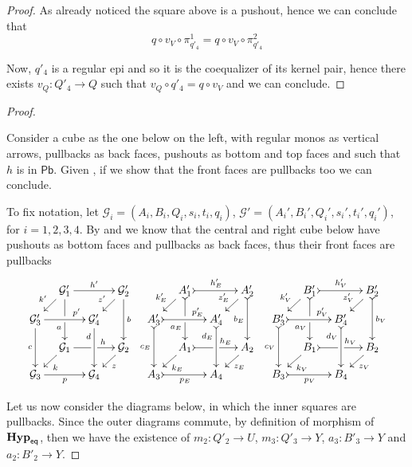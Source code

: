 \documentclass[3p]{elsarticle}
\newcommand{\pbc}{\mathsf{Pb}}
\newcommand{\catname}[1]{\textbf{\textup{#1}}}
\newcommand{\EqHyp}{\catname{Hyp}_{\mathsf{eq}}} %
\theoremstyle{remark}
\theoremstyle{definition}
\begin{document}
\begin{proof}
As already noticed the square above is a pushout, hence we can conclude that
\[
q \circ v_V \circ \pi_{q'_4}^1 = q \circ v_V \circ \pi_{q'_4}^2
\]

Now, $q'_4$ is a regular epi and so it is the coequalizer of its kernel pair, hence there exists $v_Q\colon Q'_4\to Q$ such that $v_Q\circ q'_4=q\circ v_V$ and we can conclude.
\end{proof}

\pbvk*

\begin{proof}\label{proof:pbvk}
	
Consider a cube as the one below on the left, with regular monos as vertical arrows, pullbacks as back faces, pushouts as bottom and top faces and such that $h$ is in $\pbc$.
Given , if we show that the front faces are pullbacks too we can conclude.

To fix notation, let $\mathcal{G}_i = (A_i, B_i, Q_i, s_i, t_i, q_i)$, $\mathcal{G}'=(A_i', B_i', Q_i', s_i', t_i', q_i')$, for $i = 1, 2, 3, 4$. By  and  we know that the central and right cube below have pushouts as bottom faces and pullbacks as back faces,
	thus their front faces are pullbacks
	\[
	\xymatrix@C=10pt@R=10pt{&\mathcal{G}_1'\ar[dd]|\hole_(.65){a}\ar[rr]^{h'} \ar[dl]_{k'} && \mathcal{G}_2' \ar[dd]^{b} \ar[dl]_{z'} & &A_1'\ar@{>->}[dd]|\hole_(.65){a_E}\ar@{>->}[rr]^{h_E'} \ar[dl]_{k_E'} && A_2' \ar@{>->}[dd]_{b_E} \ar[dl]_{z_E'} &&B_1'\ar@{>->}[dd]|\hole_(.65){a_V}\ar@{>->}[rr]^{h_V'} \ar[dl]_{k_V'} && B_2' \ar@{>->}[dd]^{b_V} \ar[dl]_{z_V'} \\ 
		\mathcal{G}_3'  \ar[dd]_{c}\ar[rr]^(.7){p'} & & \mathcal{G}_4' \ar[dd]_(.3){d} &&A_3'  \ar@{>->}[dd]_{c_E}\ar@{>->}[rr]^(.7){p_E'} & & A_4' \ar@{>->}[dd]_(.3){d_E}
		&&B_3'  \ar@{>->}[dd]_{c_V}\ar@{>->}[rr]^(.7){p_V'} & & B_4' \ar@{>->}[dd]_(.3){d_V}\\
		&\mathcal{G}_1\ar[rr]|\hole^(.65){h} \ar[dl]^{k} && \mathcal{G}_2 \ar[dl]^{z} & &A_1\ar@{>->}[rr]|\hole^(.65){h_E} \ar[dl]^{k_E} && A_2 \ar[dl]^{z_E} &&B_1\ar@{>->}[rr]|\hole^(.65){h_V} \ar[dl]^{k_V} && B_2 \ar[dl]^{z_V} \\
		\mathcal{G}_3 \ar[rr]_{p} & & \mathcal{G}_4 && A_3 \ar@{>->}[rr]_{p_E} & & A_4&&B_3 \ar@{>->}[rr]_{p_V} & & B_4 }
	\]


Let us now consider the diagrams below, in which the inner squares are pullbacks.	Since the outer diagrams commute, by definition of morphism of $\EqHyp$, then we have the existence of $m_2\colon Q'_2\to U$, $m_3\colon Q'_3\to Y $, $a_3\colon B'_3\to Y$ and $a_2\colon B'_2\to Y$.


\end{proof}
\end{document}
